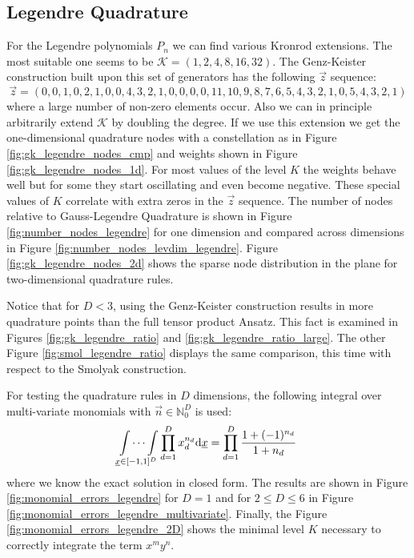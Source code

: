 \documentclass[a4paper,10pt]{article}
\begin{document}

\subsection{Legendre Quadrature}

For the Legendre polynomials $P_n$ we can find various Kronrod extensions. The
most suitable one seems to be $\mathcal{K} = (1,2,4,8,16,32)$. The Genz-Keister
construction built upon this set of generators has the following $\vec{z}$
sequence:
\begin{equation*}
  \vec{z} = (0, 0, 1, 0, 2, 1, 0, 0, 4, 3, 2, 1, 0, 0, 0, 0, 11, 10, 9, 8, 7, 6, 5, 4, 3, 2, 1, 0, 5, 4, 3, 2, 1)
\end{equation*}
where a large number of non-zero elements occur. Also we can in principle
arbitrarily extend $\mathcal{K}$ by doubling the degree. If we use this
extension we get the one-dimensional quadrature nodes with a constellation
as in Figure \ref{fig:gk_legendre_nodes_cmp} and weights shown in Figure
\ref{fig:gk_legendre_nodes_1d}. For most values of the level $K$ the weights
behave well but for some they start oscillating and even become negative.
These special values of $K$ correlate with extra zeros in the $\vec{z}$ sequence.
The number of nodes relative to Gauss-Legendre Quadrature is shown
in Figure \ref{fig:number_nodes_legendre} for one dimension and
compared across dimensions in Figure \ref{fig:number_nodes_levdim_legendre}.
Figure \ref{fig:gk_legendre_nodes_2d} shows the sparse node distribution
in the plane for two-dimensional quadrature rules.

Notice that for $D < 3$, using the Genz-Keister construction results
in more quadrature points than the full tensor product Ansatz. This
fact is examined in Figures \ref{fig:gk_legendre_ratio} and \ref{fig:gk_legendre_ratio_large}.
The other Figure \ref{fig:smol_legendre_ratio} displays the same comparison,
this time with respect to the Smolyak construction.

For testing the quadrature rules in $D$ dimensions, the following integral
over multi-variate monomials with $\vec{n} \in \mathbb{N}_0^D$ is used:
\begin{equation} \label{eq:legendre_exact_solution}
  \idotsint \limits_{\underline{x} \in [-1,1]^D} \prod_{d=1}^D x_d^{n_d} \mathrm{d}\underline{x}
  =
  \prod_{d=1}^D \frac{1 + (-1)^{n_d}}{1 + n_d}
\end{equation}
where we know the exact solution in closed form. The results are shown in
Figure \ref{fig:monomial_errors_legendre} for $D=1$ and for $2 \leq D \leq 6$
in Figure \ref{fig:monomial_errors_legendre_multivariate}. Finally, the Figure
\ref{fig:monomial_errors_legendre_2D} shows the minimal level $K$ necessary to
correctly integrate the term $x^m y^n$.
\end{document}
